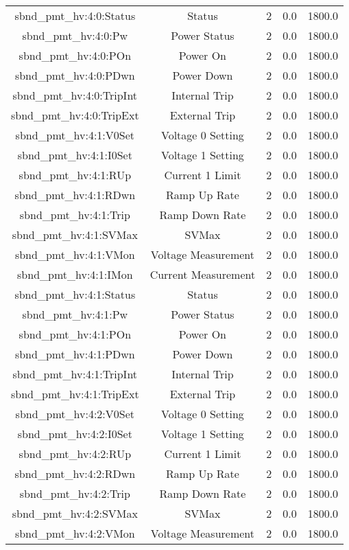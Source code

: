 \begin{table}[ptb]
\begin{tabular}{c | c c c c}
sbnd_pmt_hv:4:0:Status & Status & 2 & 0.0 & 1800.0\\ 
sbnd_pmt_hv:4:0:Pw & Power Status & 2 & 0.0 & 1800.0\\ 
sbnd_pmt_hv:4:0:POn & Power On & 2 & 0.0 & 1800.0\\ 
sbnd_pmt_hv:4:0:PDwn & Power Down & 2 & 0.0 & 1800.0\\ 
sbnd_pmt_hv:4:0:TripInt & Internal Trip & 2 & 0.0 & 1800.0\\ 
sbnd_pmt_hv:4:0:TripExt & External Trip & 2 & 0.0 & 1800.0\\ 
sbnd_pmt_hv:4:1:V0Set & Voltage 0 Setting & 2 & 0.0 & 1800.0\\ 
sbnd_pmt_hv:4:1:I0Set & Voltage 1 Setting & 2 & 0.0 & 1800.0\\ 
sbnd_pmt_hv:4:1:RUp & Current 1 Limit & 2 & 0.0 & 1800.0\\ 
sbnd_pmt_hv:4:1:RDwn & Ramp Up Rate & 2 & 0.0 & 1800.0\\ 
sbnd_pmt_hv:4:1:Trip & Ramp Down Rate & 2 & 0.0 & 1800.0\\ 
sbnd_pmt_hv:4:1:SVMax & SVMax & 2 & 0.0 & 1800.0\\ 
sbnd_pmt_hv:4:1:VMon & Voltage Measurement & 2 & 0.0 & 1800.0\\ 
sbnd_pmt_hv:4:1:IMon & Current Measurement & 2 & 0.0 & 1800.0\\ 
sbnd_pmt_hv:4:1:Status & Status & 2 & 0.0 & 1800.0\\ 
sbnd_pmt_hv:4:1:Pw & Power Status & 2 & 0.0 & 1800.0\\ 
sbnd_pmt_hv:4:1:POn & Power On & 2 & 0.0 & 1800.0\\ 
sbnd_pmt_hv:4:1:PDwn & Power Down & 2 & 0.0 & 1800.0\\ 
sbnd_pmt_hv:4:1:TripInt & Internal Trip & 2 & 0.0 & 1800.0\\ 
sbnd_pmt_hv:4:1:TripExt & External Trip & 2 & 0.0 & 1800.0\\ 
sbnd_pmt_hv:4:2:V0Set & Voltage 0 Setting & 2 & 0.0 & 1800.0\\ 
sbnd_pmt_hv:4:2:I0Set & Voltage 1 Setting & 2 & 0.0 & 1800.0\\ 
sbnd_pmt_hv:4:2:RUp & Current 1 Limit & 2 & 0.0 & 1800.0\\ 
sbnd_pmt_hv:4:2:RDwn & Ramp Up Rate & 2 & 0.0 & 1800.0\\ 
sbnd_pmt_hv:4:2:Trip & Ramp Down Rate & 2 & 0.0 & 1800.0\\ 
sbnd_pmt_hv:4:2:SVMax & SVMax & 2 & 0.0 & 1800.0\\ 
sbnd_pmt_hv:4:2:VMon & Voltage Measurement & 2 & 0.0 & 1800.0\\ 

\end{tabular}
\end{table}

